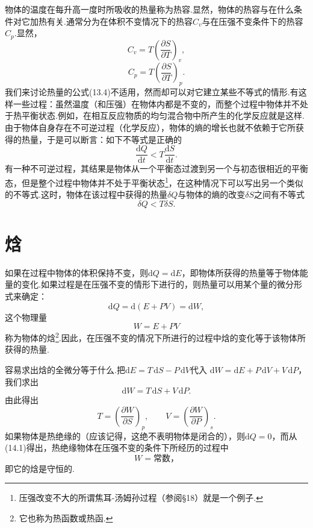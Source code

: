 物体的温度在每升高一度时所吸收的热量称为热容.显然，物体的热容与在什么条件对它加热有关.通常分为在体积不变情况下的热容$C_v$与在压强不变条件下的热容$C_p$.显然，
\begin{equation}
  C_v=T\left(\frac{\partial S}{\partial T}\right)_v,
\end{equation}
\begin{equation}
  C_p=T\left(\frac{\partial S}{\partial T}\right)_p.
\end{equation}
我们来讨论热量的公式(13.4)不适用，然而却可以对它建立某些不等式的情形.有这样一些过程：虽然温度（和压强）在物体内都是不变的，而整个过程中物体并不处于热平衡状态.例如，在相互反应物质的均匀混合物中所产生的化学反应就是这样.由于物体自身存在不可逆过程（化学反应），物体的熵的增长也就不依赖于它所获得的热量，于是可以断言：如下不等式是正确的
\begin{equation}
  \frac{\mathrm{d}Q}{\mathrm{d}t}
  <T\frac{\mathrm{d}S}{\mathrm{d}t}.
\end{equation}
有一种不可逆过程，其结果是物体从一个平衡态过渡到另一个与初态很相近的平衡态，但是整个过程中物体并不处于平衡状态\footnote{压强改变不大的所谓焦耳-汤姆孙过程（参阅§18）就是一个例子.}，在这种情况下可以写出另一个类似的不等式.这时，物体在该过程中获得的热量$\delta Q$与物体的熵的改变$\delta S$之间有不等式
\begin{equation}
  \delta Q<T\delta S.
\end{equation}

\section{焓}

如果在过程中物体的体积保持不变，则$\mathrm{d}Q=\mathrm{d}E$，即物体所获得的热量等于物体能量的变化.如果过程是在压强不变的情形下进行的，则热量可以用某个量的微分形式来确定：
\begin{equation}
  \mathrm{d}Q=\mathrm{d}(E+PV)=\mathrm{d}W,
\end{equation}
这个物理量
\begin{equation}
  W=E+PV
\end{equation}
称为物体的焓\footnote{它也称为热函数或热函.}.因此，在压强不变的情况下所进行的过程中焓的变化等于该物体所获得的热量.

容易求出焓的全微分等于什么.把$\mathrm{d}E=T\,\mathrm{d}S-P\,\mathrm{d}V$代入
$\mathrm{d}W=\mathrm{d}E+P\,\mathrm{d}V+V\,\mathrm{d}P$，我们求出
\begin{equation}
  \mathrm{d}W=T\,\mathrm{d}S+V\,\mathrm{d}P.
\end{equation}
由此得出
\begin{equation}
  T=\left(\frac{\partial W}{\partial S}\right)_p,\qquad
  V=\left(\frac{\partial W}{\partial P}\right)_s.
\end{equation}
如果物体是热绝缘的（应该记得，这绝不表明物体是闭合的），则$\mathrm{d}Q=0$，而从(14.1)得出，热绝缘物体在压强不变的条件下所经历的过程中
\begin{equation}
  W=\text{常数，}
\end{equation}
即它的焓是守恒的.

